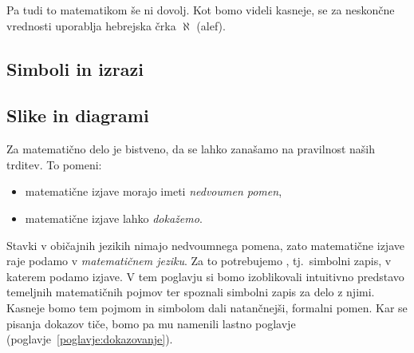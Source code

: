 Pa tudi to matematikom še ni dovolj. Kot bomo videli kasneje, se za neskončne vrednosti uporablja hebrejska črka $\aleph$ (alef).


\subsection{Simboli in izrazi}
\label{sec:simboli-in-irazi}


\subsection{Slike in diagrami}
\label{sec:slike-in-diagrami}





Za matematično delo je bistveno, da se lahko zanašamo na pravilnost naših trditev. To pomeni:
\begin{itemize}
\item
matematične izjave morajo imeti \emph{nedvoumen pomen},
\item
matematične izjave lahko \emph{dokažemo}.
\end{itemize}

Stavki v običajnih jezikih nimajo nedvoumnega pomena, zato matematične izjave raje podamo v \emph{matematičnem jeziku}. Za to potrebujemo , tj.~simbolni zapis, v katerem podamo izjave. V tem poglavju si bomo izoblikovali intuitivno predstavo temeljnih matematičnih pojmov ter spoznali simbolni zapis za delo z njimi. Kasneje bomo tem pojmom in simbolom dali natančnejši, formalni pomen. Kar se pisanja dokazov tiče, bomo pa mu namenili lastno poglavje (poglavje~\ref{poglavje:dokazovanje}).


